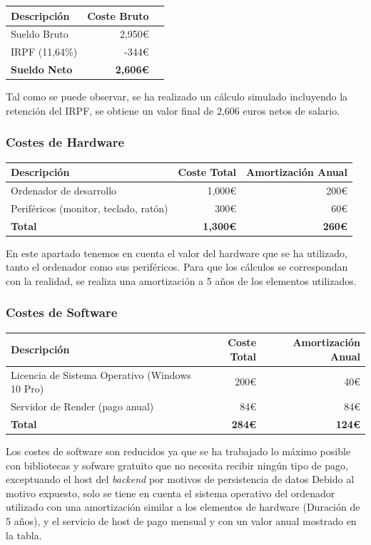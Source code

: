 \begin{tabular}{lrr}
\toprule
Descripción & Coste Bruto \\
\midrule
Sueldo Bruto & 2,950€ \\
IRPF (11,64\%) & -344€ \\
\textbf{Sueldo Neto} & \textbf{2,606€} \\
\bottomrule
\end{tabular}

Tal como se puede observar, se ha realizado un cálculo simulado incluyendo la retención del IRPF, se obtiene un valor final de 2,606 euros netos de salario.

\subsubsection*{Costes de Hardware}

\begin{tabular}{lrr}
\toprule
Descripción & Coste Total & Amortización Anual \\
\midrule
Ordenador de desarrollo & 1,000€ & 200€ \\
Periféricos (monitor, teclado, ratón) & 300€ & 60€ \\
\textbf{Total} & \textbf{1,300€} & \textbf{260€} \\
\bottomrule
\end{tabular}

En este apartado tenemos en cuenta el valor del hardware que se ha utilizado, tanto el ordenador como sus periféricos. Para que los cálculos se correspondan con la realidad, se realiza una amortización a 5 años de los elementos utilizados.

\subsubsection*{Costes de Software}

\begin{tabular}{lrr}
\toprule
Descripción & Coste Total & Amortización Anual \\
\midrule
Licencia de Sistema Operativo (Windows 10 Pro) & 200€ & 40€ \\
Servidor de Render (pago anual) & 84€ & 84€ \\
\textbf{Total} & \textbf{284€} & \textbf{124€} \\
\bottomrule
\end{tabular}

Los costes de software son reducidos ya que se ha trabajado lo máximo posible con bibliotecas y sofware gratuito que no necesita recibir ningún tipo de pago, exceptuando el host del \textit{backend} por motivos de persistencia de datos
Debido al motivo expuesto, solo se tiene en cuenta el sistema operativo del ordenador utilizado con una amortización similar a los elementos de hardware (Duración de 5 años), y el servicio de host de pago mensual y con un valor anual mostrado en la tabla.

